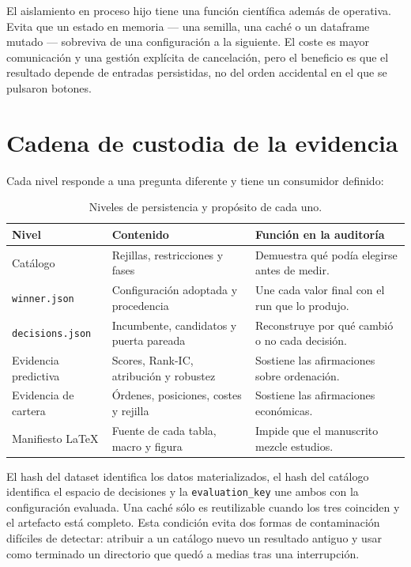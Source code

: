 El aislamiento en proceso hijo tiene una función científica además de operativa. Evita que un estado
en memoria --- una semilla, una caché o un dataframe mutado --- sobreviva de una configuración a la
siguiente. El coste es mayor comunicación y una gestión explícita de cancelación, pero el beneficio
es que el resultado depende de entradas persistidas, no del orden accidental en el que se pulsaron
botones.

\section{Cadena de custodia de la evidencia}

Cada nivel responde a una pregunta diferente y tiene un consumidor definido:

\begin{table}[H]
  \centering
  \small
  \begin{tabularx}{\textwidth}{p{3.1cm}X X}
    \toprule
    Nivel & Contenido & Función en la auditoría \\
    \midrule
    Catálogo & Rejillas, restricciones y fases & Demuestra qué podía elegirse antes de medir. \\
    \texttt{winner.json} & Configuración adoptada y procedencia & Une cada valor final con el run que lo produjo. \\
    \texttt{decisions.json} & Incumbente, candidatos y puerta pareada & Reconstruye por qué cambió o no cada decisión. \\
    Evidencia predictiva & Scores, Rank-IC, atribución y robustez & Sostiene las afirmaciones sobre ordenación. \\
    Evidencia de cartera & Órdenes, posiciones, costes y rejilla & Sostiene las afirmaciones económicas. \\
    Manifiesto LaTeX & Fuente de cada tabla, macro y figura & Impide que el manuscrito mezcle estudios. \\
    \bottomrule
  \end{tabularx}
  \caption{Niveles de persistencia y propósito de cada uno.}
  \label{tab:cadena-custodia}
\end{table}

El hash del dataset identifica los datos materializados, el hash del catálogo identifica el espacio
de decisiones y la \texttt{evaluation\_key} une ambos con la configuración evaluada. Una caché sólo
es reutilizable cuando los tres coinciden y el artefacto está completo. Esta condición evita dos
formas de contaminación difíciles de detectar: atribuir a un catálogo nuevo un resultado antiguo y
usar como terminado un directorio que quedó a medias tras una interrupción.

